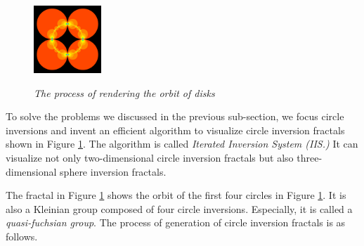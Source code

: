 \begin{figure}[htbp]
\begin{minipage}[t]{0.16\hsize}
  \subcaption{}
  \label{fig:level2}
 \end{minipage}
 \begin{minipage}[t]{0.16\hsize}
  \center
  \includegraphics[width=1in, height=1in, keepaspectratio]{img/preparation/orbit/levelMaxc.pdf}
  \subcaption{}
  \label{fig:levelMax}
 \end{minipage}
 \caption{\textit{The process of rendering the orbit of disks}}
 \label{fig:schottkyProcess}
\end{figure}

\noindent To solve the problems we discussed in the previous sub-section,
we focus circle inversions and invent an efficient algorithm to
visualize circle inversion fractals shown in Figure \ref{fig:schottkyProcess}.
The algorithm is called \textit{Iterated Inversion System (IIS.)}
It can visualize not only two-dimensional circle inversion fractals but
also three-dimensional sphere inversion fractals.

The fractal in Figure \ref{fig:schottkyProcess} shows the orbit of the first
four circles in Figure \ref{fig:schottkyProcess}. 
It is also a Kleinian group composed of four circle inversions.
Especially, it is called a \textit{quasi-fuchsian group}.
The process of generation of circle inversion fractals is
as follows.

